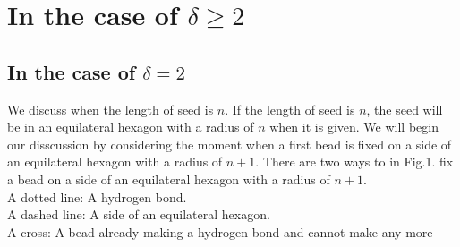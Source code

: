 \documentclass[runningheads]{llncs}
\begin{document}
\section{In the case of $\delta \geq 2$}

\subsection{In the case of $\delta = 2$}

We discuss when the length of seed is $n$. If the length of seed is $n$, the seed will be in an equilateral hexagon with a radius of $n$ when it is given. We will begin our disscussion by considering the moment when a first bead is fixed on a side of an equilateral hexagon with a radius of $n+1$. There are two ways to in Fig.1. fix a bead on a side of an equilateral hexagon with a radius of $n+1$.\\
A dotted line: A hydrogen bond.\\
A dashed line: A side of an equilateral hexagon.\\
A cross: A bead already making a hydrogen bond and cannot make any more
\end{document}
